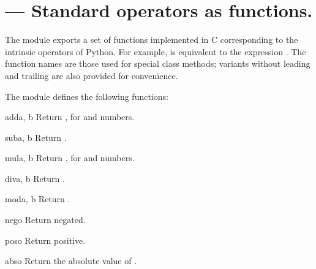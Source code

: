 \section{ ---
         Standard operators as functions.}



The  module exports a set of functions implemented in C
corresponding to the intrinsic operators of Python.  For example,
 is equivalent to the expression .  The
function names are those used for special class methods; variants without
leading and trailing \samp{__} are also provided for convenience.

The  module defines the following functions:

\begin{funcdesc}{add}{a, b}
Return  \code{+} , for  and  numbers.
\end{funcdesc}

\begin{funcdesc}{sub}{a, b}
Return  \code{-} .
\end{funcdesc}

\begin{funcdesc}{mul}{a, b}
Return  \code{*} , for  and  numbers.
\end{funcdesc}

\begin{funcdesc}{div}{a, b}
Return  \code{/} .
\end{funcdesc}

\begin{funcdesc}{mod}{a, b}
Return  \code{\%} .
\end{funcdesc}

\begin{funcdesc}{neg}{o}
Return  negated.
\end{funcdesc}

\begin{funcdesc}{pos}{o}
Return  positive.
\end{funcdesc}

\begin{funcdesc}{abs}{o}
Return the absolute value of .
\end{funcdesc}

